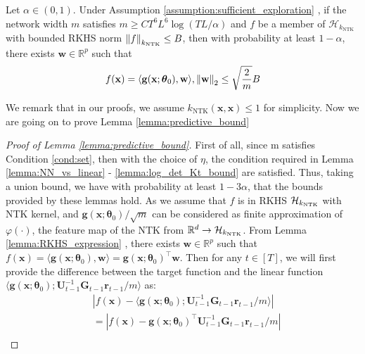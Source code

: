 \begin{sublemma} 
\label{lemma:RKHS_expression}
Let $\alpha \in (0,1)$. Under Assumption \ref{assumption:sufficient_exploration} , if the network width $m$ satisfies  $m \geq C T^6L^6 \log(TL/\alpha)$ and $f$ be a member of $\mathcal{H}_{k_\text{NTK}}$ with bounded RKHS norm $\norm{f}_{k_\text{NTK}} \leq B$, then with probability at least $1-\alpha$, there exists $\mathbf{w} \in \mathbb{R}^p$ such that 
\[ f(\mathbf{x}) = \langle \mathbf{g}(\mathbf{x}; \boldsymbol{\theta}_0), \mathbf{w} \rangle, \norm{\mathbf{w}}_2 \leq \sqrt{\frac{2}{m}}B \]
\end{sublemma}
We remark that in our proofs, we assume $k_{\text{NTK}}(\mathbf{x}, \mathbf{x}) \leq 1$ for simplicity. Now we are going on to prove Lemma \ref{lemma:predictive_bound}
\begin{proof}[Proof of Lemma \ref{lemma:predictive_bound}]
First of all, since m satisfies Condition \ref{cond:set}, then with the choice of $\eta$, the condition required in Lemma \ref{lemma:NN_vs_linear} - \ref{lemma:log_det_Kt_bound} are satisfied. Thus, taking a union bound, we have with probability at least $1 - 3\alpha$, that the bounds provided by these lemmas hold. 
As we assume that $f$ is in RKHS $\mathcal{H}_{k_\textup{NTK}}$ with NTK kernel, and $\mathbf{g}(\mathbf{x}; \boldsymbol{\theta}_0)/\sqrt{m}$  can be considered as finite approximation of $\varphi(\cdot)$, the feature map of the NTK from $\mathbb{R}^d \rightarrow \mathcal{H}_{k_\textup{NTK}}$. From Lemma \ref{lemma:RKHS_expression} , there exists $\mathbf{w} \in \mathbb{R}^p$ such that $f(\mathbf{x}) = \langle \mathbf{g}(\mathbf{x}; \boldsymbol{\theta}_0), \mathbf{w} \rangle = \mathbf{g}(\mathbf{x}; \boldsymbol{\theta}_0)^\top \mathbf{w}$. 
Then for any $t \in [T]$, we will first provide the difference between the target function and the linear function
$\langle \mathbf{g}(\mathbf{x}; \boldsymbol{\theta}_0); \mathbf{U}^{-1}_{t-1} \mathbf{G}_{t-1} \mathbf{r}_{t-1}/m \rangle$ as:
\begin{equation}
\label{ieqn:confidence_interval}
    \begin{split}
         & \left \lvert f(\mathbf{x}) - \langle \mathbf{g}(\mathbf{x}; \boldsymbol{\theta}_0); \mathbf{U}^{-1}_{t-1} \mathbf{G}_{t-1} \mathbf{r}_{t-1}/m \rangle   \right \rvert  \\
        & = \left\lvert f(\mathbf{x}) - \mathbf{g}(\mathbf{x}; \boldsymbol{\theta}_0)^\top  \mathbf{U}^{-1}_{t-1} \mathbf{G}_{t-1} \mathbf{r}_{t-1}/m \right\rvert \\

\end{split}
\end{equation}
\end{proof}
